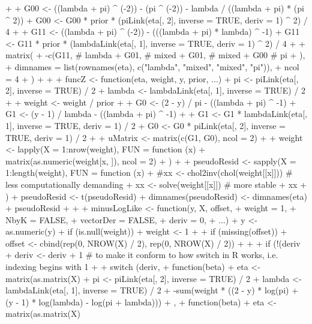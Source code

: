 \documentclass[
]{jss}
\newcommand{\1}{\mathcal{I}} \newcommand{\bx}{\boldsymbol{x}}
\begin{document}
\begin{CodeChunk}
\begin{CodeInput}
{{+     
+     G00 <- ((lambda + pi) ^ (-2)) - (pi ^ (-2)) - lambda / ((lambda + pi) * (pi ^ 2))
+     G00 <- G00 * prior * (piLink(eta[, 2], inverse = TRUE, deriv = 1) ^ 2) / 4
+     
+     G11 <- ((lambda + pi) ^ (-2)) - (((lambda + pi) * lambda) ^ -1)
+     G11 <- G11 * prior * (lambdaLink(eta[, 1], inverse = TRUE, deriv = 1) ^ 2) / 4
+     
+     matrix(
+       -c(G11, # lambda
+          G01, # mixed
+          G01, # mixed
+          G00  # pi
+       ),
+       dimnames = list(rownames(eta), c("lambda", "mixed", "mixed", "pi")),
+       ncol = 4
+     )
+   }
+   
+   funcZ <- function(eta, weight, y, prior, ...) {
+     pi     <-     piLink(eta[, 2], inverse = TRUE) / 2
+     lambda <- lambdaLink(eta[, 1], inverse = TRUE) / 2
+     
+     weight <- weight / prior
+     
+     G0 <- (2 - y) / pi     - ((lambda + pi) ^ -1)
+     G1 <- (y - 1) / lambda - ((lambda + pi) ^ -1)
+     
+     G1 <- G1 * lambdaLink(eta[, 1], inverse = TRUE, deriv = 1) / 2
+     G0 <- G0 *     piLink(eta[, 2], inverse = TRUE, deriv = 1) / 2
+     
+     uMatrix <- matrix(c(G1, G0), ncol = 2)
+     
+     weight <- lapply(X = 1:nrow(weight), FUN = function (x) {
+       matrix(as.numeric(weight[x, ]), ncol = 2)
+     })
+     
+     pseudoResid <- sapply(X = 1:length(weight), FUN = function (x) {
+       #xx <- chol2inv(chol(weight[[x]])) # less computationally demanding
+       xx <- solve(weight[[x]]) # more stable
+       xx %
+     })
+     pseudoResid <- t(pseudoResid)
+     dimnames(pseudoResid) <- dimnames(eta)
+     pseudoResid
+   }
+   
+   minusLogLike <- function(y, X, offset,
+                            weight    = 1, 
+                            NbyK      = FALSE, 
+                            vectorDer = FALSE, 
+                            deriv     = 0, 
+                            ...) {
+     y <- as.numeric(y)
+     if (is.null(weight)) {
+       weight <- 1
+     }
+     if (missing(offset)) {
+       offset <- cbind(rep(0, NROW(X) / 2), rep(0, NROW(X) / 2))
+     }
+     
+     if (!(deriv %
+     deriv <- deriv + 1 # to make it conform to how switch in R works, i.e. indexing begins with 1
+     
+     switch (deriv,
+       function(beta) {
+         eta <- matrix(as.matrix(X) %
+         pi     <-     piLink(eta[, 2], inverse = TRUE) / 2
+         lambda <- lambdaLink(eta[, 1], inverse = TRUE) / 2
+         -sum(weight * ((2 - y) * log(pi) + (y - 1) * log(lambda) - log(pi + lambda)))
+       },
+       function(beta) {
+         eta <- matrix(as.matrix(X) %
}}}
\end{CodeInput}
\end{CodeChunk}
\end{document}
